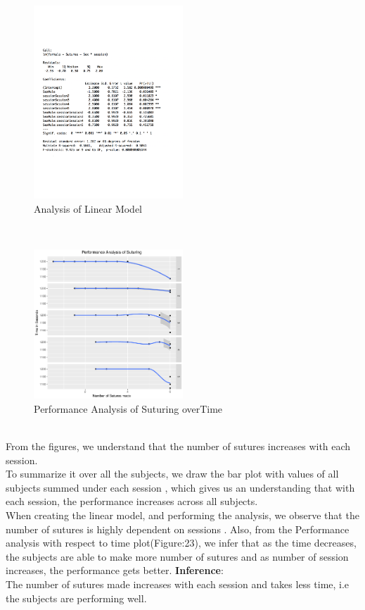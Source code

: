 \documentclass[12pt,epsf]{report}
\begin{document}
\begin{figure}[!htb]
	\centering
	\includegraphics[width=0.5\textwidth]{Suture_Sex_Summary.pdf}
	\caption{Analysis of Linear Model}
	\centering
\end{figure}\\
\begin{figure}[!htb]
	\centering
	\includegraphics[width=0.5\textwidth]{SuturingVsTime.pdf}
	\caption{Performance Analysis of Suturing overTime }
	\centering
\end{figure}\\
From the figures, we understand that the number of sutures increases with each session. \\
To summarize it over all the subjects, we draw the bar plot with values of all subjects summed under each session , which gives us an understanding that with each session, the performance increases across all subjects.\\
When creating the linear model, and performing the analysis, we observe that the number of sutures is highly dependent on sessions .
Also, from the Performance analysis with respect to time plot(Figure:23), we infer that as the time decreases, the subjects are able to make more number of sutures and as number of session increases, the performance gets better.
\textbf{Inference}:\\
The number of sutures made increases with each session and takes less time, i.e the subjects are performing well.\\
\\
\FloatBarrier
\end{document}

